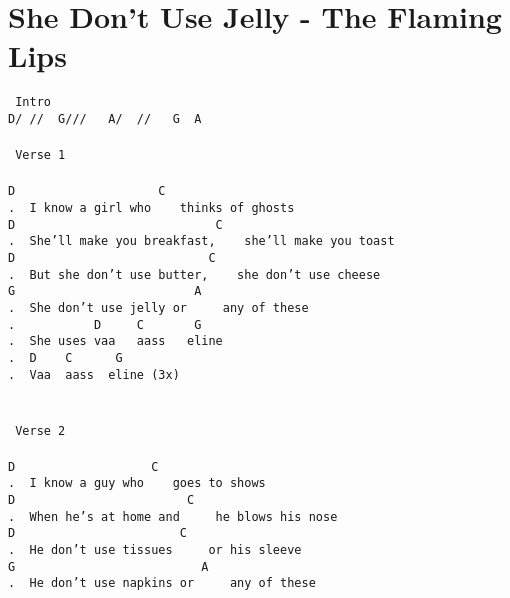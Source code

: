 \newpage
\section{She Don't Use Jelly - The Flaming Lips}
\label{She Don't Use Jelly - The Flaming Lips}
\texttt{\lbrack\ Intro\rbrack\\
D/\ //\ \ G///\ \ \ A/\ \ //\ \ \ G\ \ A\\
\\
\lbrack\ Verse\ 1\rbrack\\
\\
D\ \ \ \ \ \ \ \ \ \ \ \ \ \ \ \ \ \ \ \ C\\
.\ \ I\ know\ a\ girl\ who\ \ \ \ thinks\ of\ ghosts\\
D\ \ \ \ \ \ \ \ \ \ \ \ \ \ \ \ \ \ \ \ \ \ \ \ \ \ \ \ C\\
.\ \ She'll\ make\ you\ breakfast,\ \ \ \ she'll\ make\ you\ toast\\
D\ \ \ \ \ \ \ \ \ \ \ \ \ \ \ \ \ \ \ \ \ \ \ \ \ \ \ C\\
.\ \ But\ she\ don't\ use\ butter,\ \ \ \ she\ don't\ use\ cheese\\
G\ \ \ \ \ \ \ \ \ \ \ \ \ \ \ \ \ \ \ \ \ \ \ \ \ A\\
.\ \ She\ don't\ use\ jelly\ or\ \ \ \ \ any\ of\ these\\
.\ \ \ \ \ \ \ \ \ \ \ D\ \ \ \ \ C\ \ \ \ \ \ \ G\\
.\ \ She\ uses\ vaa\ \ \ aass\ \ \ eline\\
.\ \ D\ \ \ \ C\ \ \ \ \ \ G\\
.\ \ Vaa\ \ aass\ \ eline\ (3x)\\
\\
\\
\lbrack\ Verse\ 2\rbrack\\
\\
D\ \ \ \ \ \ \ \ \ \ \ \ \ \ \ \ \ \ \ C\\
.\ \ I\ know\ a\ guy\ who\ \ \ \ goes\ to\ shows\\
D\ \ \ \ \ \ \ \ \ \ \ \ \ \ \ \ \ \ \ \ \ \ \ \ C\\
.\ \ When\ he's\ at\ home\ and\ \ \ \ \ he\ blows\ his\ nose\\
D\ \ \ \ \ \ \ \ \ \ \ \ \ \ \ \ \ \ \ \ \ \ \ C\\
.\ \ He\ don't\ use\ tissues\ \ \ \ \ or\ his\ sleeve\\
G\ \ \ \ \ \ \ \ \ \ \ \ \ \ \ \ \ \ \ \ \ \ \ \ \ \ A\\
.\ \ He\ don't\ use\ napkins\ or\ \ \ \ \ any\ of\ these\\
}
